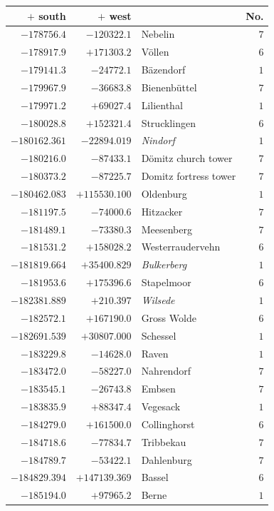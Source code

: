 \clearpage{}%
\begin{center}\begingroup\fontsize{8}{9}\selectfont
\setlength{\tabcolsep}{4pt}
\begin{tabular}{r|r|p{170pt}|r}\hline
\(+\) south&\(+\) west&&No.\\\hline
\(-178756.4\)&\(-120322.1\)&Nebelin&\(7\)\\
\(-178917.9\)&\(+171303.2\)&Völlen&\(6\)\\
\(-179141.3\)&\(-24772.1\)&Bäzendorf&\(1\)\\
\(-179967.9\)&\(-36683.8\)&Bienenbüttel&\(7\)\\
\(-179971.2\)&\(+69027.4\)&Lilienthal&\(1\)\\
\(-180028.8\)&\(+152321.4\)&Strucklingen&\(6\)\\
\(-180162.361\)&\(-22894.019\)&\textit{Nindorf}&\(1\)\\
\(-180216.0\)&\(-87433.1\)&Dömitz church tower&\(7\)\\
\(-180373.2\)&\(-87225.7\)&Domitz fortress tower&\(7\)\\
\(-180462.083\)&\(+115530.100\)&Oldenburg&\(1\)\\
\(-181197.5\)&\(-74000.6\)&Hitzacker&\(7\)\\
\(-181489.1\)&\(-73380.3\)&Meesenberg&\(7\)\\
\(-181531.2\)&\(+158028.2\)&Westerraudervehn&\(6\)\\
\(-181819.664\)&\(+35400.829\)&\textit{Bulkerberg}&\(1\)\\
\(-181953.6\)&\(+175396.6\)&Stapelmoor&\(6\)\\
\(-182381.889\)&\(+210.397\)&\textit{Wilsede}&\(1\)\\
\(-182572.1\)&\(+167190.0\)&Gross Wolde&\(6\)\\
\(-182691.539\)&\(+30807.000\)&Schessel&\(1\)\\
\(-183229.8\)&\(-14628.0\)&Raven&\(1\)\\
\(-183472.0\)&\(-58227.0\)&Nahrendorf&\(7\)\\
\(-183545.1\)&\(-26743.8\)&Embsen&\(7\)\\
\(-183835.9\)&\(+88347.4\)&Vegesack&\(1\)\\
\(-184279.0\)&\(+161500.0\)&Collinghorst&\(6\)\\
\(-184718.6\)&\(-77834.7\)&Tribbekau&\(7\)\\
\(-184789.7\)&\(-53422.1\)&Dahlenburg&\(7\)\\
\(-184829.394\)&\(+147139.369\)&Bassel&\(6\)\\
\(-185194.0\)&\(+97965.2\)&Berne&\(1\)\\

\end{tabular}
\end{center}
